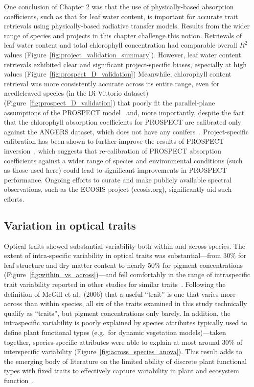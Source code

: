 One conclusion of Chapter 2 was that the use of physically-based absorption coefficients, such as that for leaf water content, is important for accurate trait retrievals using physically-based radiative transfer models.
Results from the wider range of species and projects in this chapter challenge this notion.
Retrievals of leaf water content and total chlorophyll concentration had comparable overall $R^2$ values (Figure~\ref{fig:project_validation_summary}).
However, leaf water content retrievals exhibited clear and significant project-specific biases, especially at high values (Figure~\ref{fig:prospect_D_validation})
Meanwhile, chlorophyll content retrieval was more consistently accurate across its entire range, even for needleleaved species (in the Di Vittorio dataset) (Figure~\ref{fig:prospect_D_validation}) that poorly fit the parallel-plane assumptions of the PROSPECT model~\cite{allen_1969_interaction,jacquemoud_1990_prospect} and, more importantly, despite the fact that the chlorophyll absorption coefficients for PROSPECT are calibrated only against the ANGERS dataset, which does not have any conifers~\cite{feret_2008_prospect,feret_2017_prospectd}.
Project-specific calibration has been shown to further improve the results of PROSPECT inversion~\cite{li_2013_retrieval}, which suggests that re-calibration of PROSPECT absorption coefficients against a wider range of species and environmental conditions (such as those used here) could lead to significant improvements in PROSPECT performance.
Ongoing efforts to curate and make publicly available spectral observations, such as the ECOSIS project (ecosis.org), significantly aid such efforts.

\subsection{Variation in optical traits}

Optical traits showed substantial variability both within and across species.
The extent of intra-specific variability in optical traits was substantial---from 30\% for leaf structure and dry matter content to nearly 50\% for pigment concentrations (Figure~\ref{fig:within_vs_across})---and fell comfortably in the range of intraspecific trait variability reported in other studies for similar traits~\cite{messier_how_2010,albert_multi-trait_2010}.
Following the definition of McGill et al.~(2006) that a useful ``trait'' is one that varies more across than within species, all six of the traits examined in this study technically qualify as ``traits'', but pigment concentrations only barely. \nocite{mcgill_2006_rebuilding}
In addition, the intraspecific variability is poorly explained by species attributes typically used to define plant functional types (e.g.\ for dynamic vegetation models)---taken together, species-specific attributes were able to explain at most around 30\% of interspecific variability (Figure~\ref{fig:across_species_anova}).
This result adds to the emerging body of literature on the limited ability of discrete plant functional types with fixed traits to effectively capture variability in plant and ecosystem function~\cite{vanbodegom2012_beyond,vanbodegom2014_fully,verheijen2015_variation,clark_why_2016}.

